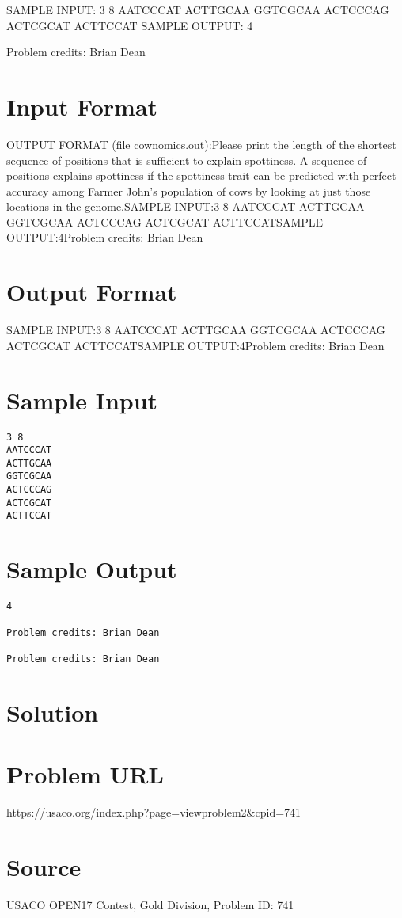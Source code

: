 \documentclass[12pt]{article}
\begin{document}
SAMPLE INPUT:
3 8
AATCCCAT
ACTTGCAA
GGTCGCAA
ACTCCCAG
ACTCGCAT
ACTTCCAT
SAMPLE OUTPUT: 
4


Problem credits: Brian Dean



\section*{Input Format}
OUTPUT FORMAT (file cownomics.out):Please print the length of the shortest sequence of positions that is sufficient
to explain spottiness.  A sequence of positions explains spottiness if the
spottiness trait can be predicted with perfect accuracy among Farmer John's
population of cows by looking at just those locations in the genome.SAMPLE INPUT:3 8
AATCCCAT
ACTTGCAA
GGTCGCAA
ACTCCCAG
ACTCGCAT
ACTTCCATSAMPLE OUTPUT:4Problem credits: Brian Dean

\section*{Output Format}
SAMPLE INPUT:3 8
AATCCCAT
ACTTGCAA
GGTCGCAA
ACTCCCAG
ACTCGCAT
ACTTCCATSAMPLE OUTPUT:4Problem credits: Brian Dean

\section*{Sample Input}
\begin{verbatim}
3 8
AATCCCAT
ACTTGCAA
GGTCGCAA
ACTCCCAG
ACTCGCAT
ACTTCCAT
\end{verbatim}

\section*{Sample Output}
\begin{verbatim}
4

Problem credits: Brian Dean

Problem credits: Brian Dean
\end{verbatim}

\section*{Solution}


\section*{Problem URL}
https://usaco.org/index.php?page=viewproblem2&cpid=741

\section*{Source}
USACO OPEN17 Contest, Gold Division, Problem ID: 741
\end{document}
